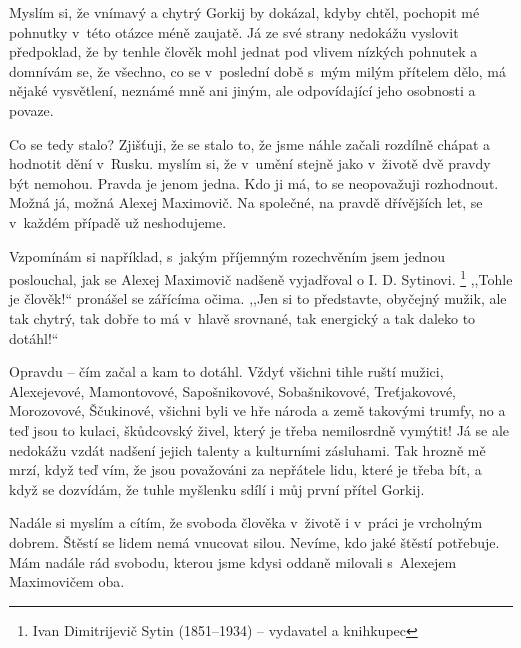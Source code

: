 Myslím si, že vnímavý a chytrý Gorkij by dokázal, kdyby chtěl, pochopit mé pohnutky v této otázce méně zaujatě. Já ze své strany nedokážu vyslovit předpoklad, že by tenhle člověk mohl jednat pod vlivem nízkých pohnutek a domnívám se, že všechno, co se v poslední době s mým milým přítelem dělo, má nějaké vysvětlení, neznámé mně ani jiným, ale odpovídající jeho osobnosti a povaze. 

Co se tedy stalo? Zjišťuji, že se stalo to, že jsme náhle začali rozdílně chápat a hodnotit dění v Rusku. myslím si, že v umění stejně jako v životě dvě pravdy být nemohou. Pravda je jenom jedna. Kdo ji má, to se neopovažuji rozhodnout. Možná já, možná Alexej Maximovič. Na společné, na pravdě dřívějších let, se v každém případě už neshodujeme.

Vzpomínám si například, s jakým příjemným rozechvěním jsem jednou poslouchal, jak se Alexej Maximovič nadšeně vyjadřoval o I. D. Sytinovi. \footnote{Ivan Dimitrijevič Sytin (1851--1934) -- vydavatel a knihkupec} ,,Tohle je člověk!`` pronášel se zářícíma očima. ,,Jen si to představte, obyčejný mužik, ale tak chytrý, tak dobře to má v hlavě srovnané, tak energický a tak daleko to dotáhl!``

Opravdu -- čím začal a kam to dotáhl. Vždyť všichni tihle ruští mužici, Alexejevové, Mamontovové, Sapošnikovové, Sobašnikovové, Treťjakovové, Morozovové, Ščukinové, všichni byli ve hře národa a země takovými trumfy, no a teď jsou to kulaci, škůdcovský živel, který je třeba nemilosrdně vymýtit! Já se ale nedokážu vzdát nadšení jejich talenty a kulturními zásluhami. Tak hrozně mě mrzí, když teď vím, že jsou považováni za nepřátele lidu, které je třeba bít, a když se dozvídám, že tuhle myšlenku sdílí i můj první přítel Gorkij.

Nadále si myslím a cítím, že svoboda člověka v životě i v práci je vrcholným dobrem. Štěstí se lidem nemá vnucovat silou. Nevíme, kdo jaké štěstí potřebuje. Mám nadále rád svobodu, kterou jsme kdysi oddaně milovali s Alexejem Maximovičem oba.

